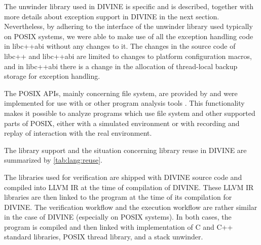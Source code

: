 The unwinder library used in DIVINE is \divm specific and is described,
together with more details about exception support in DIVINE in the next
section.
Nevertheless, by adhering to the interface of the unwinder library used typically
on POSIX systems, we were able to make use of all the exception handling code
in libc++abi without any changes to it.
The changes in the source code of libc++ and libc++abi are limited to changes to platform configuration macros, and in libc++abi there is a change in the allocation of thread-local backup storage for exception handling.

The POSIX APIs, mainly concerning file system, are provided by \dios and were
implemented for use with \divine or other program analysis tools .
This functionality makes it possible to analyze programs which use file system and other supported parts of POSIX, either with a simulated environment or with recording and replay of interaction with the real environment.

The library support and the situation concerning library reuse in DIVINE are summarized by \autoref{tab:lang:reuse}.

The libraries used for verification are shipped with DIVINE source code and
compiled into LLVM IR at the time of compilation of DIVINE.
These LLVM IR libraries are then linked to the program at the time of its
compilation for DIVINE.
The verification workflow and the execution workflow are rather similar in the
case of DIVINE (especially on POSIX systems).
In both cases, the program is compiled and then linked with implementation of
C and C++ standard libraries, POSIX thread library, and a stack unwinder.

